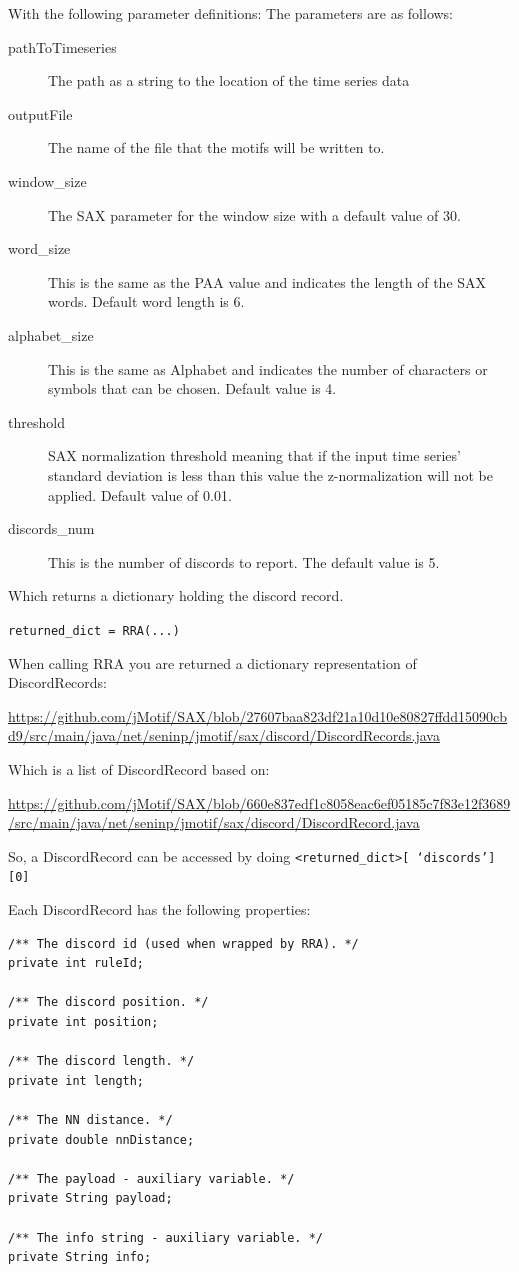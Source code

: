 \documentclass[titlepage, letterpaper, 12pt]{article}
\def\bsq#1{%
	\lq{#1}\rq}
\begin{document}
With the following parameter definitions:
The parameters are as follows:
\begin{description}
	\item[pathToTimeseries] The path as a string to the location of the time series data
	\item[outputFile] The name of the file that the motifs will be written to.
	\item[window\_size] The SAX parameter for the window size with a default value of 30.
	\item[word\_size] This is the same as the PAA value and indicates the length of the SAX words.  Default word length is 6.
	\item[alphabet\_size] This is the same as Alphabet and indicates the number of characters or symbols that can be chosen.  Default value is 4.
	
	\item[threshold] SAX normalization threshold meaning that if the input time series' standard deviation is less than this value the z-normalization will not be applied. Default value of 0.01.
	\item[discords\_num] This is the number of discords to report.  The default value is 5.
\end{description}
	
Which returns a dictionary holding the discord record.

\texttt{returned\_dict = RRA(...)}

When calling RRA you are returned a dictionary representation of DiscordRecords:

\url{https://github.com/jMotif/SAX/blob/27607baa823df21a10d10e80827ffdd15090cbd9/src/main/java/net/seninp/jmotif/sax/discord/DiscordRecords.java}

Which is a list of DiscordRecord based on:

\url{https://github.com/jMotif/SAX/blob/660e837edf1c8058eac6ef05185c7f83e12f3689/src/main/java/net/seninp/jmotif/sax/discord/DiscordRecord.java}

So, a DiscordRecord can be accessed by doing 
\texttt{<returned\_dict>[\bsq{discords}][0]}

Each DiscordRecord has the following properties:
\begin{lstlisting}
/** The discord id (used when wrapped by RRA). */
private int ruleId;

/** The discord position. */
private int position;

/** The discord length. */
private int length;

/** The NN distance. */
private double nnDistance;

/** The payload - auxiliary variable. */
private String payload;

/** The info string - auxiliary variable. */
private String info;

\end{lstlisting}
\end{document}
